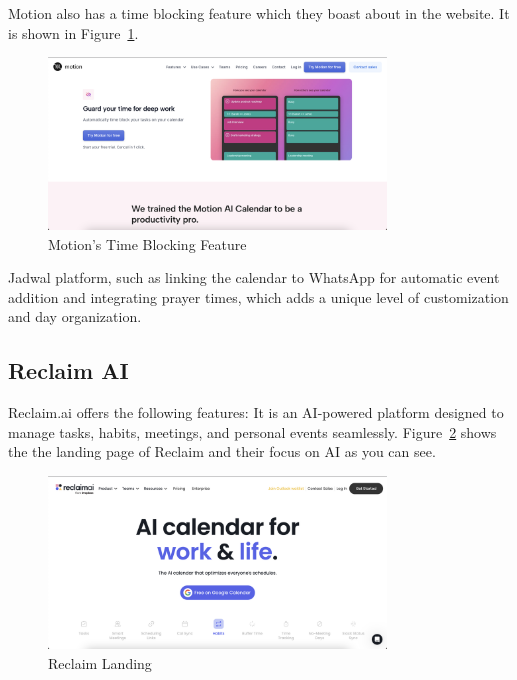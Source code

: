 \documentclass[12pt,a4paper]{report}
\begin{document}
Motion also has a time blocking feature which they boast about in the website.
It is shown in Figure~\ref{fig:motion-time-blocking}.

\begin{figure}[!h]
    \centering
    \includegraphics[width=0.8\textwidth]{images/competitors/motion-time-blocking.png}
    \caption{Motion's Time Blocking Feature}
    \label{fig:motion-time-blocking}
\end{figure}

Jadwal platform, such as linking the calendar to WhatsApp for automatic event addition and integrating prayer times, which adds a unique level of customization and day organization.

\subsection{Reclaim AI}

Reclaim.ai offers the following features: It is an AI-powered platform designed to manage tasks, habits, meetings, and personal events seamlessly.
Figure~\ref{fig:reclaim-landing} shows the the landing page of Reclaim and their focus on AI as you can see.

\begin{figure}[!h]
    \centering
    \includegraphics[width=0.8\textwidth]{images/competitors/reclaim-landing.png}
    \caption{Reclaim Landing}
    \label{fig:reclaim-landing}
\end{figure}
\end{document}
